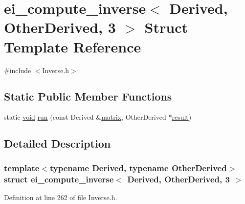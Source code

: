 \hypertarget{structei__compute__inverse_3_01_derived_00_01_other_derived_00_013_01_4}{\section{ei\-\_\-compute\-\_\-inverse$<$ Derived, Other\-Derived, 3 $>$ Struct Template Reference}
\label{structei__compute__inverse_3_01_derived_00_01_other_derived_00_013_01_4}
}


{\ttfamily \#include $<$Inverse.\-h$>$}

\subsection*{Static Public Member Functions}
\begin{DoxyCompactItemize}
\item 
static \hyperlink{group___u_a_v_objects_plugin_ga444cf2ff3f0ecbe028adce838d373f5c}{void} \hyperlink{structei__compute__inverse_3_01_derived_00_01_other_derived_00_013_01_4_a2de646fe459e8706252a43e62093538a}{run} (const Derived \&\hyperlink{glext_8h_a7b24a3f2f56eb1244ae69dacb4fecb6f}{matrix}, Other\-Derived $\ast$\hyperlink{qxtslotjob_8h_aab161efab0511ea9612b64c40e9852ca}{result})
\end{DoxyCompactItemize}


\subsection{Detailed Description}
\subsubsection*{template$<$typename Derived, typename Other\-Derived$>$struct ei\-\_\-compute\-\_\-inverse$<$ Derived, Other\-Derived, 3 $>$}



Definition at line 262 of file Inverse.\-h.



